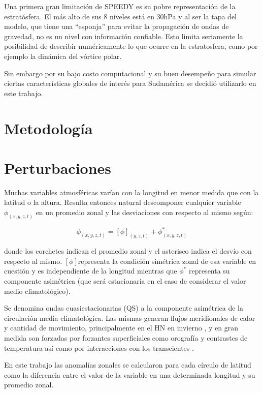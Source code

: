 \documentclass[spanish,a4paper,12pt,oneside]{book}
\begin{document}
Una primera gran limitación de SPEEDY es su pobre representación de la
estratósfera. El más alto de sus 8 niveles está en 30hPa y al ser la
tapa del modelo, que tiene una ``esponja'' para evitar la propagación de
ondas de gravedad, no es un nivel con información confiable. Esto limita
seriamente la posibilidad de describir numéricamente lo que ocurre en la
estratosfera, como por ejemplo la dinámica del vórtice polar.

Sin embargo por su bajo costo computacional y su buen desempeño para
simular ciertas características globales de interés para Sudamérica
\citep{Barreiro2014} se decidió utilizarlo en este trabajo.

\section{Metodología}\label{metodologia}

\section*{Perturbaciones}

Muchas variables atmosféricas varían con la longitud en menor medida que
con la latitud o la altura. Resulta entonces natural descomponer
cualquier variable \(\phi_{(x, y, z, t)}\) en un promedio zonal y las
desviaciones con respecto al mismo según:

\[
\phi_{(x, y, z, t)} = [\phi]_{(y, z, t)} + \phi_{(x, y, z, t)}^*
\]

donde los corchetes indican el promedio zonal y el asterisco indica el
desvío con respecto al mismo. \([\phi]\)representa la condición
simétrica zonal de esa variable en cuestión y es independiente de la
longitud mientras que \(\phi^*\) representa su componente asimétrica
(que será estacionaria en el caso de considerar el valor medio
climatológico).

Se denomina ondas cuasiestacionarias (QS) a la componente asimétrica de
la circulación media climatológica. Las mismas generan flujos
meridionales de calor y cantidad de movimiento, principalmente en el HN
en invierno \citep{James}, y en gran medida son forzadas por forzantes
superficiales como orografía y contrastes de temperatura así como por
interacciones con los transcientes \citep{Rao2004}.

En este trabajo las anomalías zonales se calcularon para cada círculo de
latitud como la diferencia entre el valor de la variable en una
determinada longitud y su promedio zonal.
\end{document}
